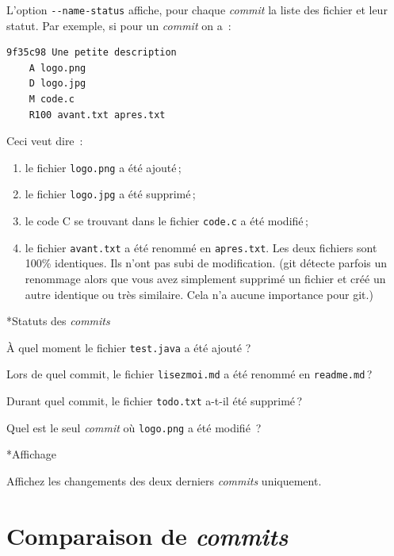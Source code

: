 \documentclass[a4paper,11pt]{style-esi/td}
\begin{document}
L'option \texttt{-{}-name-status} affiche, pour chaque \textit{commit} la liste
des fichier et leur statut.  Par exemple, si pour un \textit{commit} on a~:

\begin{verbatim}
9f35c98 Une petite description
    A logo.png 
    D logo.jpg 
    M code.c 
    R100 avant.txt apres.txt 
\end{verbatim}

Ceci veut dire~:

\begin{enumerate}
	\item le fichier \texttt{logo.png} a été ajouté ;
	\item le fichier \texttt{logo.jpg} a été supprimé ;
	\item le code C se trouvant dans le fichier \texttt{code.c} a été modifié ;
	\item le fichier \texttt{avant.txt} a été renommé en \texttt{apres.txt}. Les 
		deux fichiers sont 100\% identiques. Ils n'ont pas subi de modification. (git détecte parfois un renommage alors que vous avez simplement supprimé un fichier et créé un autre identique ou très similaire. Cela n'a aucune importance pour git.)
\end{enumerate}

\begin{Exercice}*{Statuts des \textit{commits}}
\begin{steps}
	
	\item À quel moment le fichier \texttt{test.java} a été ajouté ?
	\item Lors de quel commit, le fichier \texttt{lisezmoi.md} a été renommé en 
		\texttt{readme.md} ?
	\item Durant quel commit, le fichier \texttt{todo.txt} a-t-il été supprimé ?
	\item Quel est le seul \textit{commit} où \texttt{logo.png} a été modifié ? 

\end{steps}
\end{Exercice}

\begin{Exercice}*{Affichage}
	\begin{steps}
	\item Affichez les changements des deux derniers \textit{commits} uniquement.
	\end{steps}
\end{Exercice}


\section{Comparaison de \textit{commits}}
\end{document}
